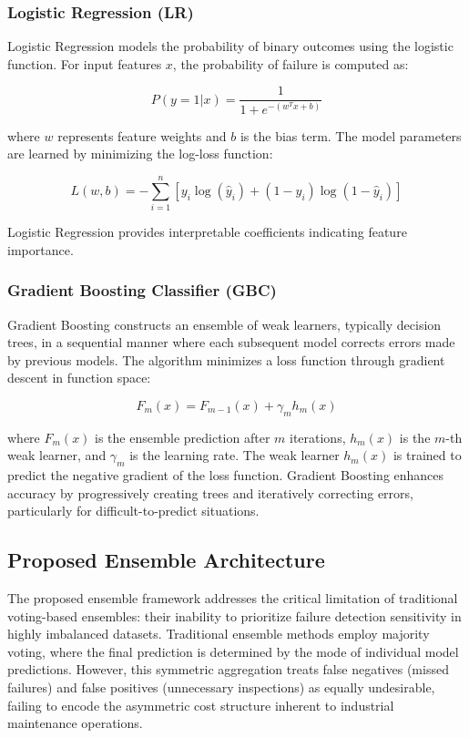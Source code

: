 \documentclass[final,5p, twocolumn]{elsarticle}
\begin{document}
\subsubsection{Logistic Regression (LR)}

Logistic Regression models the probability of binary outcomes using the logistic function. For input features $x$, the probability of failure is computed as:

\begin{equation}
P(y=1|x) = \frac{1}{1 + e^{-(w^T x + b)}}
\end{equation}

where $w$ represents feature weights and $b$ is the bias term. The model parameters are learned by minimizing the log-loss function:

\begin{equation}
L(w, b) = -\sum_{i=1}^{n}[y_i \log(\hat{y}_i) + (1-y_i)\log(1-\hat{y}_i)]
\end{equation}

Logistic Regression provides interpretable coefficients indicating feature importance.

\subsubsection{Gradient Boosting Classifier (GBC)}

Gradient Boosting constructs an ensemble of weak learners, typically decision trees, in a sequential manner where each subsequent model corrects errors made by previous models. The algorithm minimizes a loss function through gradient descent in function space:

\begin{equation}
F_m(x) = F_{m-1}(x) + \gamma_m h_m(x)
\end{equation}

where $F_m(x)$ is the ensemble prediction after $m$ iterations, $h_m(x)$ is the $m$-th weak learner, and $\gamma_m$ is the learning rate. The weak learner $h_m(x)$ is trained to predict the negative gradient of the loss function. Gradient Boosting enhances accuracy by progressively creating trees and iteratively correcting errors, particularly for difficult-to-predict situations.

\subsection{Proposed Ensemble Architecture}
The proposed ensemble framework addresses the critical limitation of traditional voting-based ensembles: their inability to prioritize failure detection sensitivity in highly imbalanced datasets. Traditional ensemble methods employ majority voting, where the final prediction is determined by the mode of individual model predictions. However, this symmetric aggregation treats false negatives (missed failures) and false positives (unnecessary inspections) as equally undesirable, failing to encode the asymmetric cost structure inherent to industrial maintenance operations.
\end{document}
